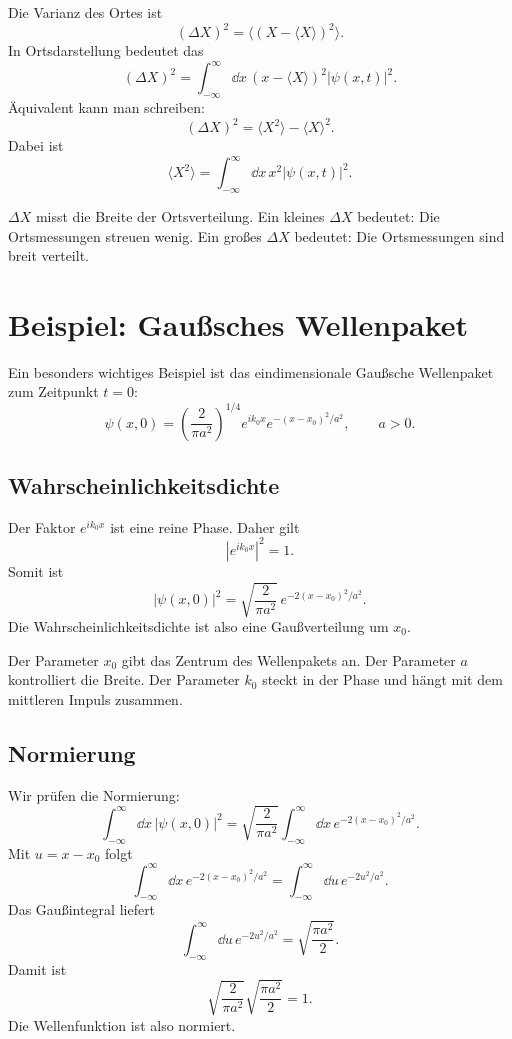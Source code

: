 Die Varianz des Ortes ist
\[
    (\Delta X)^2
    =\langle (X-\langle X\rangle)^2\rangle.
\]
In Ortsdarstellung bedeutet das
\[
    (\Delta X)^2
    =\int_{-\infty}^{\infty}\dd x\,(x-\langle X\rangle)^2|\psi(x,t)|^2.
\]
Äquivalent kann man schreiben:
\[
    (\Delta X)^2
    =\langle X^2\rangle-\langle X\rangle^2.
\]
Dabei ist
\[
    \langle X^2\rangle
    =\int_{-\infty}^{\infty}\dd x\,x^2|\psi(x,t)|^2.
\]

\begin{conceptbox}
$\Delta X$ misst die Breite der Ortsverteilung. Ein kleines $\Delta X$ bedeutet: Die Ortsmessungen streuen wenig. Ein großes $\Delta X$ bedeutet: Die Ortsmessungen sind breit verteilt.
\end{conceptbox}

\section{Beispiel: Gaußsches Wellenpaket}

Ein besonders wichtiges Beispiel ist das eindimensionale Gaußsche Wellenpaket zum Zeitpunkt $t=0$:
\[
    \psi(x,0)
    =\left(\frac{2}{\pi a^2}\right)^{1/4}
    e^{ik_0x}e^{-(x-x_0)^2/a^2},
    \qquad a>0.
\]

\subsection{Wahrscheinlichkeitsdichte}

Der Faktor $e^{ik_0x}$ ist eine reine Phase. Daher gilt
\[
    |e^{ik_0x}|^2=1.
\]
Somit ist
\[
    |\psi(x,0)|^2
    =\sqrt{\frac{2}{\pi a^2}}\,e^{-2(x-x_0)^2/a^2}.
\]
Die Wahrscheinlichkeitsdichte ist also eine Gaußverteilung um $x_0$.

\begin{conceptbox}
Der Parameter $x_0$ gibt das Zentrum des Wellenpakets an. Der Parameter $a$ kontrolliert die Breite. Der Parameter $k_0$ steckt in der Phase und hängt mit dem mittleren Impuls zusammen.
\end{conceptbox}

\subsection{Normierung}

\begin{calculationbox}
Wir prüfen die Normierung:
\[
    \int_{-\infty}^{\infty}\dd x\,|\psi(x,0)|^2
    =\sqrt{\frac{2}{\pi a^2}}
    \int_{-\infty}^{\infty}\dd x\,e^{-2(x-x_0)^2/a^2}.
\]
Mit $u=x-x_0$ folgt
\[
    \int_{-\infty}^{\infty}\dd x\,e^{-2(x-x_0)^2/a^2}
    =\int_{-\infty}^{\infty}\dd u\,e^{-2u^2/a^2}.
\]
Das Gaußintegral liefert
\[
    \int_{-\infty}^{\infty}\dd u\,e^{-2u^2/a^2}
    =\sqrt{\frac{\pi a^2}{2}}.
\]
Damit ist
\[
    \sqrt{\frac{2}{\pi a^2}}\sqrt{\frac{\pi a^2}{2}}=1.
\]
Die Wellenfunktion ist also normiert.
\end{calculationbox}

